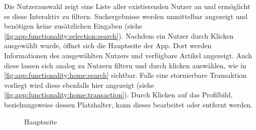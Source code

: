 Die Nutzerauswahl zeigt eine Liste aller existierenden Nutzer an und ermöglicht es diese Interaktiv zu filtern.
Suchergebnisse werden unmittelbar angezeigt und benötigen keine zusätzlichen Eingaben (siehe \autoref{fig:app:functionality:selection:search}).
Nachdem ein Nutzer durch Klicken ausgewählt wurde, öffnet sich die Hauptseite der App.
Dort werden Informationen des ausgewählten Nutzers und verfügbare Artikel angezeigt.
Auch diese lassen sich analog zu Nutzern filtern und durch klicken auswählen, wie in \autoref{fig:app:functionality:home:search} sichtbar.
Falls eine stornierbare Transaktion vorliegt wird diese ebenfalls hier angezeigt (siehe \autoref{fig:app:functionality:home:transaction}).
Durch Klicken auf das Profilbild, beziehungsweise dessen Platzhalter, kann dieses bearbeitet oder entfernt werden.
\begin{figure}%
	\centering
	\qquad
	\caption{Hauptseite}%
	\label{fig:app:functionality:home}%
\end{figure}

